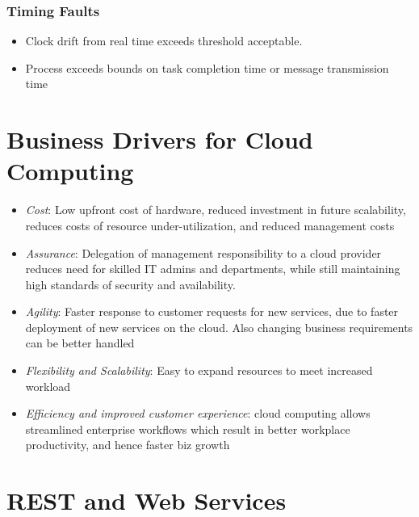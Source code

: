 \documentclass{article}
\begin{document}
\subsubsection{Timing Faults}
\begin{itemize}
    \item Clock drift from real time exceeds threshold acceptable.
    
    \item Process exceeds bounds on task completion time or message transmission time
\end{itemize}

\section{Business Drivers for Cloud Computing}
\begin{itemize}
    \item \textit{Cost}: Low upfront cost of hardware, reduced investment in future scalability, reduces costs of resource under-utilization, and reduced management costs
    
    \item \textit{Assurance}: Delegation of management responsibility to a cloud provider reduces need for skilled IT admins and departments, while still maintaining high standards of security and availability. 
    
    \item \textit{Agility}: Faster response to customer requests for new services, due to faster deployment of new services on the cloud. Also changing business requirements can be better handled
    
    \item \textit{Flexibility and Scalability}: Easy to expand resources to meet increased workload
    
    \item \textit{Efficiency and improved customer experience}: cloud computing allows streamlined enterprise workflows which result in better workplace productivity, and hence faster biz growth
\end{itemize}

\section{REST and Web Services}
\end{document}
